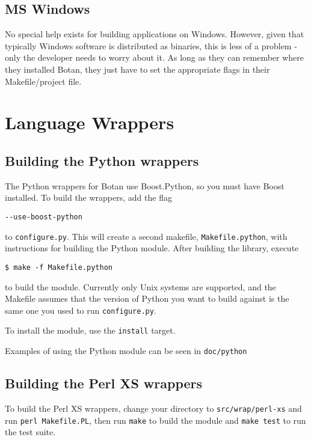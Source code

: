 \documentclass{article}
\newcommand{\filename}[1]{\texttt{#1}}
\begin{document}
\subsection{MS Windows}

No special help exists for building applications on Windows. However,
given that typically Windows software is distributed as binaries, this
is less of a problem - only the developer needs to worry about it. As
long as they can remember where they installed Botan, they just have
to set the appropriate flags in their Makefile/project file.

\section{Language Wrappers}

\subsection{Building the Python wrappers}

The Python wrappers for Botan use Boost.Python, so you must have Boost
installed. To build the wrappers, add the flag

\verb|--use-boost-python|

to \verb|configure.py|. This will create a second makefile,
\verb|Makefile.python|, with instructions for building the Python
module. After building the library, execute

\begin{verbatim}
$ make -f Makefile.python
\end{verbatim}

to build the module. Currently only Unix systems are supported, and
the Makefile assumes that the version of Python you want to build
against is the same one you used to run \verb|configure.py|.

To install the module, use the \verb|install| target.

Examples of using the Python module can be seen in \filename{doc/python}

\subsection{Building the Perl XS wrappers}

To build the Perl XS wrappers, change your directory to
\filename{src/wrap/perl-xs} and run \verb|perl Makefile.PL|, then run
\verb|make| to build the module and \verb|make test| to run the test
suite.
\end{document}
